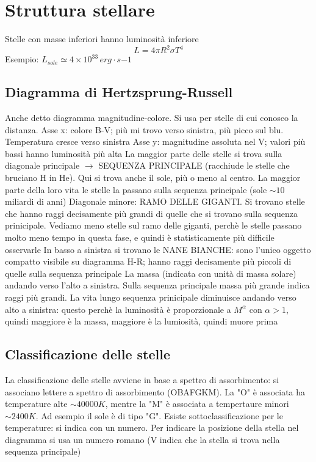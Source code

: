 \chapter{Struttura stellare}
Stelle con masse inferiori hanno luminosità inferiore
\begin{equation*}
    L = 4 \pi R^2 \sigma T^4 
\end{equation*}
Esempio: $L_{sole} \simeq 4 \times 10^33 \, erg \cdot s{-1}$

\section{Diagramma di Hertzsprung-Russell}

Anche detto diagramma magnitudine-colore. Si usa per stelle di cui conosco la distanza. \newline
Asse x: colore B-V; più mi trovo verso sinistra, più picco sul blu. Temperatura cresce verso sinistra \newline
Asse y: magnitudine assoluta nel V; valori più bassi hanno luminosità più alta \newline
La maggior parte delle stelle si trova sulla diagonale principale $\rightarrow$ SEQUENZA PRINCIPALE (racchiude le stelle che bruciano H in He). Qui si trova anche il sole, più o meno al centro. La maggior parte della loro vita le stelle la passano sulla sequenza principale (sole $\sim 10$ miliardi di anni) \newline
Diagonale minore: RAMO DELLE GIGANTI. Si trovano stelle che hanno raggi decisamente più grandi di quelle che si trovano sulla sequenza prinicipale. Vediamo meno stelle sul ramo delle giganti, perchè le stelle passano molto meno tempo in questa fase, e quindi è statisticamente più difficile osservarle \newline
In basso a sinistra si trovano le NANE BIANCHE: sono l'unico oggetto compatto visibile su diagramma H-R; hanno raggi decisamente più piccoli di quelle sulla sequenza principale \newline
La massa (indicata con unità di massa solare) andando verso l'alto a sinistra. Sulla sequenza principale massa più grande indica raggi più grandi. La vita lungo sequenza prinicipale diminuisce andando verso alto a sinistra: questo perchè la luminosità è proporzionale a $M^\alpha$ con $\alpha>1$, quindi maggiore è la massa, maggiore è la lumiosità, quindi muore prima

\section{Classificazione delle stelle}
La classificazione delle stelle avviene in base a spettro di assorbimento: si associano lettere a spettro di assorbimento (OBAFGKM). La "O" è associata ha temperature alte $\sim 40000 K$, mentre la "M" è associata a tempertaure minori $\sim 2400 K$. Ad esempio il sole è di tipo "G". Esiste sottoclassificazione per le temperature: si indica con un numero. Per indicare la posizione della stella nel diagramma si usa un numero romano (V indica che la stella si trova nella sequenza principale)

